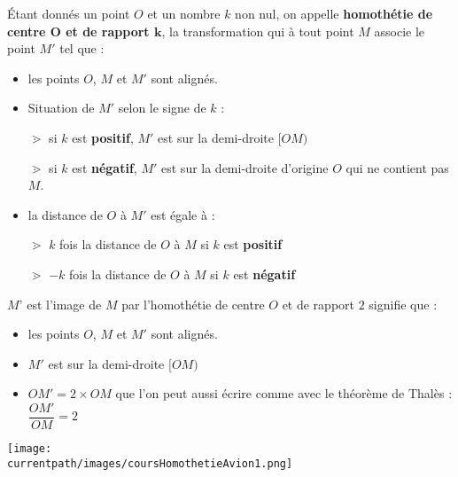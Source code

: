 \begin{definition}
    Étant donnés un point $O$ et un nombre $k$ non nul, on appelle \textbf{homothétie de centre $\mathbf{O}$ et de rapport $\mathbf{k}$}, la transformation qui à tout point $M$ associe le point $M'$ tel que :
    \begin{itemize}
        \item les points $O$, $M$ et $M'$ sont alignés.
        \item Situation de $M'$ selon le signe de $k$ :
        
        \hspace*{1cm}$\gtrdot$ si $k$ est \textbf{positif}, $M'$ est sur la demi-droite $[OM)$

        \hspace*{1cm}$\gtrdot$ si $k$ est \textbf{négatif}, $M'$ est sur la demi-droite d'origine $O$ qui ne contient pas $M$.
        \item la distance de $O$ à $M'$ est égale à :
        
        \hspace*{1cm}$\gtrdot$ $k$ fois la distance de $O$ à $M$ si $k$ est \textbf{positif}

        \hspace*{1cm}$\gtrdot$ $-k$ fois la distance de $O$ à $M$ si $k$ est \textbf{négatif}
    \end{itemize}
\end{definition}

\begin{exemple*1}

    \medskip
    \begin{minipage}{0.7\linewidth}
        $M’$ est l’image de $M$ par l’homothétie de centre $O$ et de rapport $2$ signifie que :
        \begin{itemize}
            \item les points $O$, $M$ et $M'$ sont alignés.
            \item $M'$ est sur la demi-droite $[OM)$
            \item $OM'=2\times OM$ que l'on peut aussi écrire comme avec le théorème de Thalès : $\dfrac{OM'}{OM}=2$
        \end{itemize}
    \end{minipage}    
    \begin{minipage}{0.25\linewidth}
        \texttt{[image: \\currentpath/images/coursHomothetieAvion1.png]} 
    \end{minipage}
\end{exemple*1}

